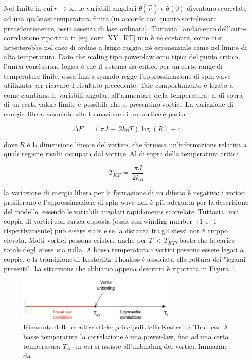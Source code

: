 Nel limite in cui $r \to \infty$, le variabili angolari $\theta\left(\vec{r}\right)$ e $\theta\left(0\right)$ diventano scorrelate ad una 
qualsiasi temperatura finita (in accordo con quanto sottolineato precedentemente, ossia assenza di fase ordinata). Tuttavia l'andamento  
dell'auto-correlazione riportata in \eqref{eq: corr_XY_KT} non è nè costante, come ci si aspetterebbe nel caso di ordine a lungo raggio, nè 
esponenziale come nel limite di alta temperatura. Dato che scaling tipo power-law sono tipici del punto critico, l'unica conclusione logica è 
che il sistema sia critico per un certo range di temperature finite, ossia fino a quando regge l'approssimazione di spin-wave utilizzata per 
ricavare il risultato precedente. Tale comportamento è legato a come cambiano le variabili angolari all'aumentare della temperatura: al di sopra di 
un certo valore limite è possibile che si presentino vortici. La variazione di energia libera associata alla formazione di un vortice è 
pari a 

\begin{equation}
    \Delta F\,=\,\left(\pi J\,-\,2 k_B T\right)\log{\left(R\right)} + c
    \label{eq: diffF_vort_KT}
\end{equation}

dove $R$ è la dimensione lineare del vortice, che fornisce un'informazione relativa a quale regione risulti occupata dal vortice. Al 
di sopra della temperatura critica 

\begin{equation}
    T_{KT}\,=\,\frac{\pi J}{2 k_B}
    \label{eq: T_KT}
\end{equation}

la variazione di energia libera per la formazione di un difetto è negativa: i vortici proliferano e l'approssimazione di spin-wave non 
è più adeguata per la descrizione del modello, essendo le variabili angolari rapidamente scorrelate. Tuttavia, una coppia di vortici con 
carica opposta (ossia con winding number +1 e -1 rispettivamente) può essere stabile se la distanza fra gli stessi non è troppo elevata. Molti 
vortici possono esistere anche per $T\,<\,T_{KT}$, basta che la carica totale degli stessi sia nulla. A bassa temperatura i vortici possono 
essere legati a coppie, e la transizione di Kosterlitz-Thouless è associata alla rottura dei "legami presenti". La situazione che abbiamo 
appena descritto è riportata in Figura \ref{fig: riass_KT}.

\begin{figure}[H]
    \centering
    \includegraphics[width=0.7\textwidth]{Immagini/riass_KT.png}
    \caption{Riassunto delle caratteristiche principali della Kosterlitz-Thouless. A basse temperature la correlazione è una power-law, fino 
    ad una certa temperatura $T_{KT}$ in cui si assiste all'unbinding dei vortici. Immagine da \cite{galliFSA}.}
    \label{fig: riass_KT}
\end{figure}


